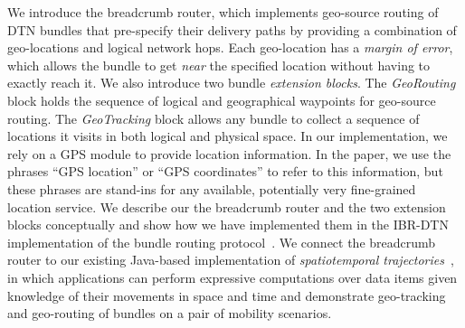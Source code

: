 We introduce the {\sc breadcrumb} router, which implements geo-source routing of DTN bundles that pre-specify their delivery paths by providing a combination of geo-locations and logical network hops. 
Each geo-location has a {\em margin of error}, which allows the bundle to get {\em near} the specified location without having to exactly reach it. We also introduce two bundle {\em extension blocks}. The {\em GeoRouting} block holds the sequence of logical and geographical waypoints for geo-source routing. The {\em GeoTracking} block allows any bundle to collect a sequence of locations it visits in both logical and physical space. In our implementation, we rely on a GPS module to provide location information. In the paper, we use the phrases ``GPS location'' or ``GPS coordinates'' to refer to this information, but these phrases are stand-ins for any available, potentially very fine-grained location service.  We describe our the {\sc breadcrumb} router and the two extension blocks conceptually and show how we have implemented them in the IBR-DTN implementation of the bundle routing protocol~\cite{IBR-DTN-WASA}. We connect the {\sc breadcrumb} router to our existing Java-based implementation of {\em spatiotemporal trajectories}~\cite{michel12:spatiotemporal}, in which applications can perform expressive computations over data items given knowledge of their movements in space and time and demonstrate geo-tracking and geo-routing of bundles on a pair of mobility scenarios.





